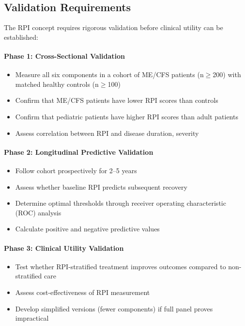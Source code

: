 \subsection{Validation Requirements}

The RPI concept requires rigorous validation before clinical utility can be established:

\paragraph{Phase 1: Cross-Sectional Validation}
\begin{itemize}
    \item Measure all six components in a cohort of ME/CFS patients (n$\geq$200) with matched healthy controls (n$\geq$100)
    \item Confirm that ME/CFS patients have lower RPI scores than controls
    \item Confirm that pediatric patients have higher RPI scores than adult patients
    \item Assess correlation between RPI and disease duration, severity
\end{itemize}

\paragraph{Phase 2: Longitudinal Predictive Validation}
\begin{itemize}
    \item Follow cohort prospectively for 2--5 years
    \item Assess whether baseline RPI predicts subsequent recovery
    \item Determine optimal thresholds through receiver operating characteristic (ROC) analysis
    \item Calculate positive and negative predictive values
\end{itemize}

\paragraph{Phase 3: Clinical Utility Validation}
\begin{itemize}
    \item Test whether RPI-stratified treatment improves outcomes compared to non-stratified care
    \item Assess cost-effectiveness of RPI measurement
    \item Develop simplified versions (fewer components) if full panel proves impractical
\end{itemize}

